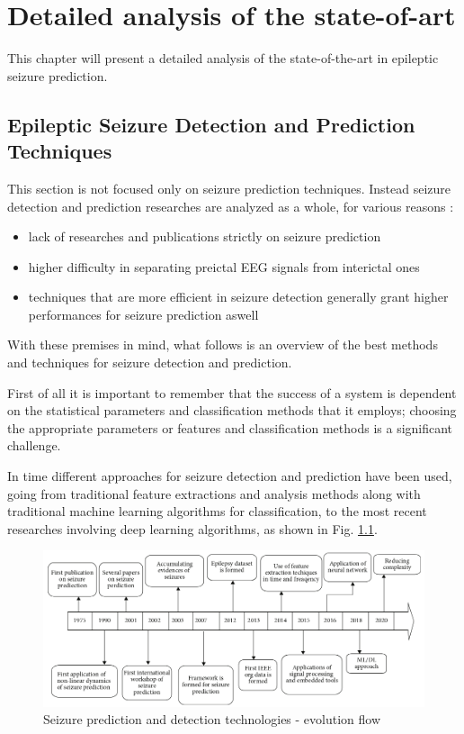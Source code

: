 \chapter{Detailed analysis of the state-of-art} \label{cpt:state-of-art}

This chapter will present a detailed analysis of the state-of-the-art in epileptic seizure prediction.

\section{Epileptic Seizure Detection and Prediction Techniques}
This section is not focused only on seizure prediction techniques. Instead seizure detection and prediction researches are analyzed as a whole, for various reasons \cite{gadhoumi_seizure_2016, bou_assi_towards_2017, natu_review_2022}:

\begin{itemize}
    \item lack of researches and publications strictly on seizure prediction 
    \item higher difficulty in separating preictal \gls{EEG} signals from interictal ones
    \item techniques that are more efficient in seizure detection generally grant higher performances for seizure prediction aswell
\end{itemize}

With these premises in mind, what follows is an overview of the best methods and techniques for seizure detection and prediction.

First of all it is important to remember that the success of a system is dependent on the statistical parameters and classification methods that it employs; choosing the appropriate parameters or features and classification methods is a significant challenge.

In time different approaches for seizure detection and prediction have been used, going from traditional feature extractions and analysis methods along with traditional machine learning algorithms for classification, to the most recent researches involving deep learning algorithms, as shown in Fig. \ref{fig:seizure-prediction-evolution-flow}.

\begin{figure}[ht]
    \centering
    \includegraphics[width=1.0\textwidth]{images/State-of-art/seizure-prediction-evolution-flow.png}
    \caption{Seizure prediction and detection technologies - evolution flow \cite{natu_review_2022}}
    \label{fig:seizure-prediction-evolution-flow}
\end{figure}

